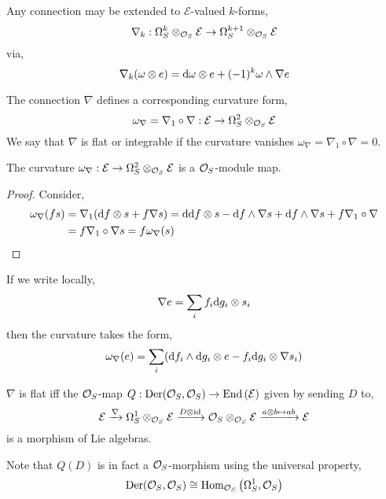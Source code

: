 \documentclass[12pt]{article}
\begin{document}
\begin{remark}
Any connection may be extended to $\mathcal{E}$-valued $k$-forms,
\[ \nabla_k : \Omega_S^k \otimes_{\mathcal{O}_{S}} \mathcal{E} \to \Omega^{k + 1}_S \otimes_{\mathcal{O}_{S}} \mathcal{E} \]
via,
\[ \nabla_k (\omega \otimes e) = \mathrm{d}{\omega} \otimes e + (-1)^k \omega \wedge \nabla e \]
\end{remark}

\begin{definition}
The connection $\nabla$ defines a corresponding curvature form,
\[ \omega_\nabla = \nabla_1 \circ \nabla : \mathcal{E} \to \Omega^2_S \otimes_{\mathcal{O}_{S}} \mathcal{E} \]
We say that $\nabla$ is flat or integrable if the curvature vanishes $\omega_\nabla = \nabla_1 \circ \nabla = 0$. 
\end{definition}

\begin{lemma}
The curvature $\omega_\nabla : \mathcal{E} \to \Omega^2_S \otimes_{\mathcal{O}_{S}} \mathcal{E}$ is a $\mathcal{O}_{S}$-module map.
\end{lemma}

\begin{proof}
Consider,
\begin{align*}
\omega_\nabla(f s) & = \nabla_1 (\mathrm{d}{f} \otimes s + f \nabla s) = \mathrm{d}{\mathrm{d}{f}} \otimes s - \mathrm{d}{f} \wedge \nabla s + \mathrm{d}{f} \wedge \nabla s + f \nabla_1 \circ \nabla 
\\
& = f \nabla_1 \circ \nabla s = f \omega_\nabla (s) 
\end{align*} 
\end{proof}

\begin{remark}
If we write locally,
\[ \nabla e = \sum_i f_i \mathrm{d}{g_i} \otimes s_i \]
then the curvature takes the form,
\[ \omega_\nabla (e) = \sum_{i} (\mathrm{d}{f_i} \wedge \mathrm{d}{g_i} \otimes e - f_i \mathrm{d}{g_i} \otimes \nabla s_i) \]
\end{remark}

\begin{proposition}
$\nabla$ is flat iff the $\mathcal{O}_{S}$-map $Q : \mathrm{Der}(\mathcal{O}_{S}, \mathcal{O}_{S}) \to \text{End}\left( \mathcal{E} \right)$ given by sending $D$ to,
\[ \mathcal{E} \xrightarrow{\nabla} \Omega^1_S \otimes_{\mathcal{O}_{S}} \mathcal{E} \xrightarrow{D \otimes \mathrm{id}} \mathcal{O}_{S} \otimes_{\mathcal{O}_{S}} \mathcal{E} \xrightarrow{a \otimes b \mapsto ab} \mathcal{E} \]
is a morphism of Lie algebras.
\end{proposition}

\begin{remark}
Note that $Q(D)$ is in fact a $\mathcal{O}_{S}$-morphism using the universal property,
\[ \mathrm{Der}(\mathcal{O}_{S}, \mathcal{O}_{S}) \cong \text{Hom}_{\mathcal{O}_{S}}\left( \Omega^1_S, \mathcal{O}_{S} \right) \]
\end{remark}
\end{document}
